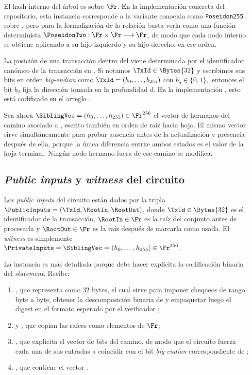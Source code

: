 El hash interno del árbol es \PoseidonHash sobre $\Fr$. En la implementación concreta del repositorio, esta instancia corresponde a la variante conocida como \texttt{Poseidon255} sobre \BLS, pero para la formalización de la relación basta verla como una función determinista $\PoseidonTwo: \Fr \times \Fr \longrightarrow \Fr$, de modo que cada nodo interno se obtiene aplicando \PoseidonTwo a su hijo izquierdo y su hijo derecho, en ese orden.

La posición de una transacción dentro del \SMT viene determinada por el identificador canónico de la transacción en \Cardano. Si notamos $\TxId \in \Bytes{32}$ y escribimos sus bits en orden \textit{big-endian} como $\TxId = (b_0,\ldots,b_{255})$ con $b_d \in \{0,1\},$ entonces el bit $b_d$ fija la dirección tomada en la profundidad $d$. En la implementación \Circom, esto está codificado en el arreglo \MtPathIndexesArray.

Sea ahora $\SiblingVec = (h_0,\ldots,h_{255}) \in \Fr^{256}$ el vector de hermanos del camino asociado a \TxId, escrito también en orden de raíz hacia hoja. El mismo vector \SiblingVec sirve simultáneamente para probar ausencia antes de la actualización y presencia después de ella, porque la única diferencia entrxe ambos estados es el valor de la hoja terminal. Ningún nodo hermano fuera de ese camino se modifica.

\subsection{\textit{Public inputs} y \textit{witness} del circuito}

Los \textit{public inputs} del circuito están dados por la tripla $\PublicInputs = (\TxId, \RootIn, \RootOut)$, donde $\TxId \in \Bytes{32}$ es el identificador de la transacción, $\RootIn \in \Fr$ es la raíz del conjunto antes de procesarla y $\RootOut \in \Fr$ es la raíz después de marcarla como usada. El \textit{witness} es simplemente $\PrivateInputs = \SiblingVec = (h_0,\ldots,h_{255}) \in \Fr^{256}$.

La instancia \Circom es más detallada porque debe hacer explícita la codificación binaria del \textit{statement}. Recibe:
\begin{enumerate}[noitemsep]
  \item {}, que representa \TxId como $32$ bytes, el cual sirve para imponer chequeos de rango byte a byte, obtener la descomposición binaria de \TxId y empaquetar luego el digest en el formato esperado por el verificador \Groth;
  \item \MtRootIn y \MtRootOut, que copian las raíces como elementos de $\Fr$;
  \item {}, que explicita el vector de bits del camino, de modo que el circuito fuerza cada una de sus entradas a coincidir con el bit \textit{big-endian} correspondiente de \TxIdBytesArray;
  \item {}, que contiene el vector \SiblingVec.
\end{enumerate}

